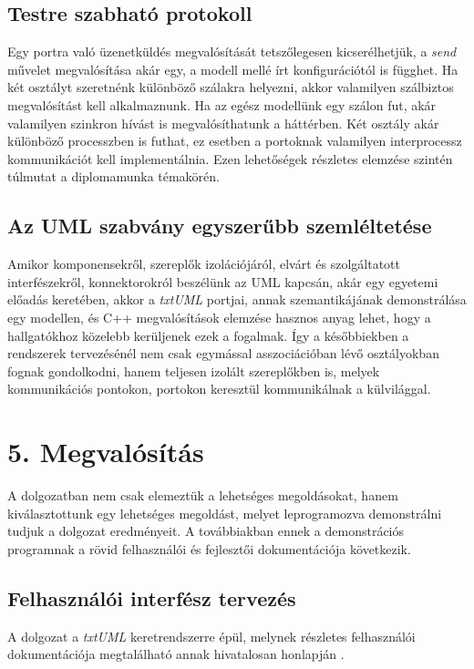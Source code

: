 \documentclass[a4paper,12pt]{report}
\begin{document}
\section{Testre szabható protokoll}
Egy portra való üzenetküldés megvalósítását tetszőlegesen kicserélhetjük, a \textit{send} művelet megvalósítása akár egy, a modell mellé írt konfigurációtól is függhet. Ha két osztályt szeretnénk különböző szálakra helyezni, akkor valamilyen szálbiztos megvalósítást kell alkalmaznunk. Ha az egész modellünk egy szálon fut, akár valamilyen szinkron hívást is megvalósíthatunk a háttérben. Két osztály akár különböző processzben is futhat, ez esetben a portoknak valamilyen interprocessz kommunikációt kell implementálnia. Ezen lehetőségek részletes elemzése szintén túlmutat a diplomamunka témakörén. 

\section{Az UML szabvány egyszerűbb szemléltetése}
Amikor komponensekről, szereplők izolációjáról, elvárt és szolgáltatott interfészekről, konnektorokról beszélünk az UML kapcsán, akár egy egyetemi előadás keretében, akkor a \textit{txtUML} portjai, annak szemantikájának demonstrálása egy modellen, és C++ megvalósítások elemzése hasznos anyag lehet, hogy a hallgatókhoz közelebb kerüljenek ezek a fogalmak. Így a későbbiekben a rendszerek tervezésénél nem csak egymással asszociációban lévő osztályokban fognak gondolkodni, hanem teljesen izolált szereplőkben is, melyek kommunikációs pontokon, portokon keresztül kommunikálnak a külvilággal. 


\chapter*{5. Megvalósítás}

A dolgozatban nem csak elemeztük a lehetséges megoldásokat, hanem kiválasztottunk egy lehetséges megoldást, melyet leprogramozva demonstrálni tudjuk a dolgozat eredményeit. A továbbiakban ennek a demonstrációs programnak a rövid felhasználói és fejlesztői dokumentációja következik.

\section{Felhasználói interfész tervezés}
A dolgozat a \textit{txtUML} keretrendszerre épül, melynek részletes felhasználói dokumentációja megtalálható annak hivatalosan honlapján \cite{txtuml_web}.
\end{document}
